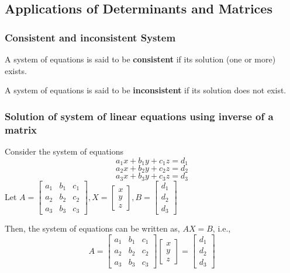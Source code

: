 \documentclass[12pt]{article}
\begin{document}
\subsection*{Applications of Determinants and Matrices}

\subsubsection*{Consistent and inconsistent System}
A system of equations is said to be \textbf{consistent} if its solution (one
or more) exists.

A system of equations is said to be \textbf{inconsistent} if its solution
does not exist.

\subsubsection*{Solution of system of linear equations using inverse of a matrix}
Consider the system of equations
    $$a_1 x+ b_1 y +c_1 z = d_1$$
   $$a_2 x+ b_2 y +c_2 z = d_2 $$
    $$a_3 x+ b_3 y +c_3 z = d_3$$
Let $A=\begin{bmatrix}
    a_1 & b_1 & c_1 \\
    a_2 & b_2 & c_2 \\
    a_3 & b_3 & c_3 
\end{bmatrix}, X = \begin{bmatrix}
    x \\
    y \\
    z
\end{bmatrix},B=\begin{bmatrix}
    d_1 \\
    d_2 \\
    d_3
\end{bmatrix}$

Then, the system of equations can be written as, $AX = B$, i.e.,
$$A=\begin{bmatrix}
    a_1 & b_1 & c_1 \\
    a_2 & b_2 & c_2 \\
    a_3 & b_3 & c_3 
\end{bmatrix} \begin{bmatrix}
    x \\
    y \\
    z
\end{bmatrix} =\begin{bmatrix}
    d_1 \\
    d_2 \\
    d_3
\end{bmatrix}$$
\end{document}
